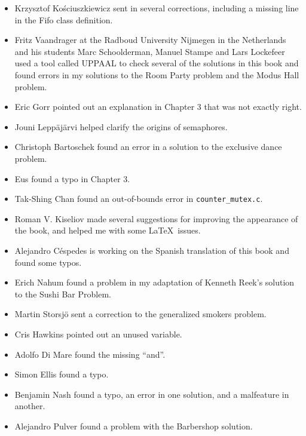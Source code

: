 \documentclass{book}
\begin{document}
\begin{itemize}
    \item Krzysztof Ko\'{s}ciuszkiewicz sent in several corrections, including
          a missing line in the Fifo class definition.

    \item Fritz Vaandrager at the Radboud University Nijmegen in the
          Netherlands and his students Marc Schoolderman, Manuel Stampe and Lars
          Lockefeer used a tool called UPPAAL to check several of the solutions
          in this book and found errors in my solutions to the Room Party problem
          and the Modus Hall problem.

    \item Eric Gorr pointed out an explanation in Chapter 3 that was
          not exactly right.

    \item Jouni Lepp\"{a}j\"{a}rvi helped clarify the origins of semaphores.

    \item Christoph Bartoschek found an error in a solution to
          the exclusive dance problem.

    \item Eus found a typo in Chapter 3.

    \item Tak-Shing Chan found an out-of-bounds error in {\tt counter\_mutex.c}.

    \item Roman V. Kiseliov made several suggestions for improving
          the appearance of the book, and helped me with some \LaTeX~issues.

    \item Alejandro C\'{e}spedes is working on the Spanish translation of this
          book and found some typos.

    \item Erich Nahum found a problem in my adaptation of Kenneth Reek's
          solution to the Sushi Bar Problem.

    \item Martin Storsj\"{o} sent a correction to the generalized smokers problem.

    \item Cris Hawkins pointed out an unused variable.

    \item Adolfo Di Mare found the missing ``and''.

    \item Simon Ellis found a typo.

    \item Benjamin Nash found a typo, an error in one solution, and
          a malfeature in another.

    \item Alejandro Pulver found a problem with the Barbershop solution.

\end{itemize}
\end{document}
